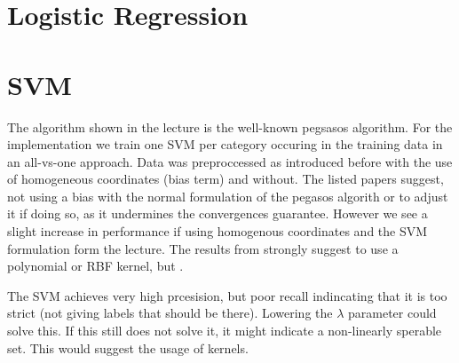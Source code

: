 \documentclass{article}
\begin{document}
\section*{Logistic Regression}
\lipsum[1-4] %

\section*{SVM}
The algorithm shown in the lecture is the well-known pegsasos algorithm\cite{shalev-shwartz_pegasos:_2011,shalev-shwartz_pegasos:_????}. For the implementation we train one SVM per category occuring in the training data in an all-vs-one approach.
Data was preproccessed as introduced before with the use of homogeneous coordinates (bias term) and without. The listed papers suggest, not using a bias with the normal formulation of the pegasos algorith or to adjust it if doing so, as it undermines the convergences guarantee. However we see a slight increase in performance if using homogenous coordinates and the SVM formulation form the lecture.
The results from \cite{joachims_text_1998} strongly suggest to use a polynomial or RBF kernel, but .


The SVM achieves very high prcesision, but poor recall indincating that it is too strict (not giving labels that should be there). Lowering the $\lambda$ parameter could solve this. If this still does not solve it, it might indicate a non-linearly sperable set. This would suggest the usage of kernels.


\printbibliography
\end{document}
